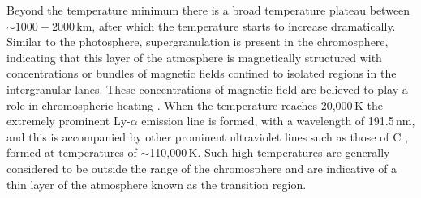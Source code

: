 
Beyond the temperature minimum there is a broad temperature plateau between $\sim$$1000-2000$\,km, after which the temperature starts to increase dramatically. Similar to the photosphere, supergranulation is present in the chromosphere, indicating that this layer of the atmosphere is magnetically structured with concentrations or bundles of magnetic fields confined to isolated regions in the intergranular lanes. These concentrations of magnetic field are believed to play a role in chromospheric heating \citep{carlsson1997}. When the temperature reaches 20,000\,K the extremely prominent Ly-$\alpha$ emission line is formed, with a wavelength of 191.5\,nm, and this is accompanied by other prominent ultraviolet lines such as those of C , formed at temperatures of $\sim$110,000\,K. Such high temperatures are generally considered to be outside the range of the chromosphere and are indicative of a thin layer of the atmosphere known as the transition region. 

